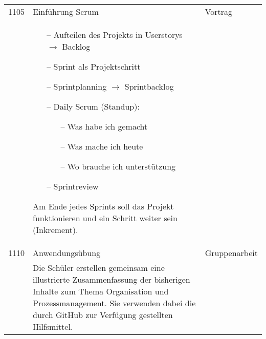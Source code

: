\documentclass[a4paper]{scrreprt}
\begin{document}
\begin{longtable}{p{1.5cm}>{\RaggedRight}p{7.5cm}p{2.5cm}}
    1105&Einführung Scrum&Vortrag\\
        &\begin{itemize}
            \item[--] Aufteilen des Projekts in Userstorys $\rightarrow$
                Backlog
            \item[--] Sprint als Projektschritt
            \item[--] Sprintplanning $\rightarrow$ Sprintbacklog
            \item[--] Daily Scrum (Standup):
                \begin{itemize}
                    \item[--] Was habe ich gemacht
                    \item[--] Was mache ich heute
                    \item[--] Wo brauche ich unterstützung
                \end{itemize}
            \item[--] Sprintreview
        \end{itemize}
        Am Ende jedes Sprints soll das Projekt funktionieren und ein
        Schritt weiter sein (Inkrement).&\\ [5pt]

      1110&Anwendungsübung&Gruppenarbeit\\
          &Die Schüler erstellen gemeinsam eine illustrierte
          Zusammenfassung der bisherigen Inhalte zum Thema Organisation
          und Prozessmanagement. Sie verwenden dabei die durch GitHub
          zur Verfügung gestellten Hilfsmittel.&\\

\end{longtable}
\end{document}
